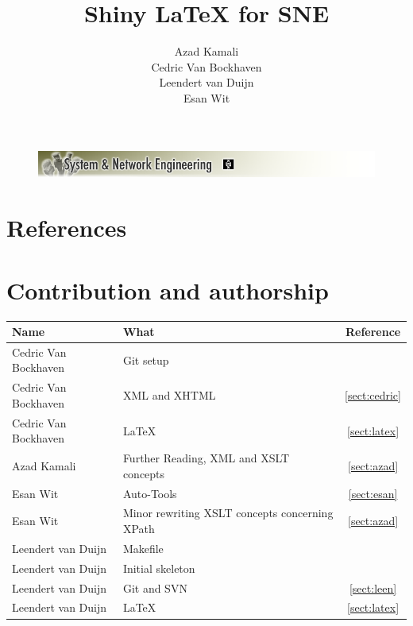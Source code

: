 \documentclass[a4paper,11pt] {article}
\title{Shiny \LaTeX{} for SNE\vspace{10pt}}
\author{
Azad Kamali\\
Cedric Van Bockhaven\\
Leendert van Duijn\\
Esan Wit\\
\vspace{10pt}
}
\begin{document}
\begin{titlepage}
	\enlargethispage{10cm}
	\begin{figure}[h]
	\includegraphics[width=1.0\textwidth]{images/SNELogo.png}
	\end{figure}
	{\let\newpage\relax\maketitle}
\end{titlepage}

\tableofcontents







\appendix
\section{References}



\section{Contribution and authorship}
\begin{tabular}{|l | l| c|}
\hline
Name& What&Reference\\
\hline

Cedric Van Bockhaven& Git setup&\\
Cedric Van Bockhaven&XML and XHTML&\ref{sect:cedric}\\
Cedric Van Bockhaven&LaTeX&\ref{sect:latex}\\
\hline
Azad Kamali& Further Reading, XML and XSLT concepts &\ref{sect:azad}\\
\hline
Esan Wit & Auto-Tools&\ref{sect:esan}\\
Esan Wit & Minor rewriting XSLT concepts concerning XPath&\ref{sect:azad}\\
\hline
Leendert van Duijn& Makefile&\\
Leendert van Duijn& Initial skeleton&\\
Leendert van Duijn& Git and SVN&\ref{sect:leen}\\
Leendert van Duijn& LaTeX&\ref{sect:latex}\\
\hline
\end{tabular}
\end{document}

